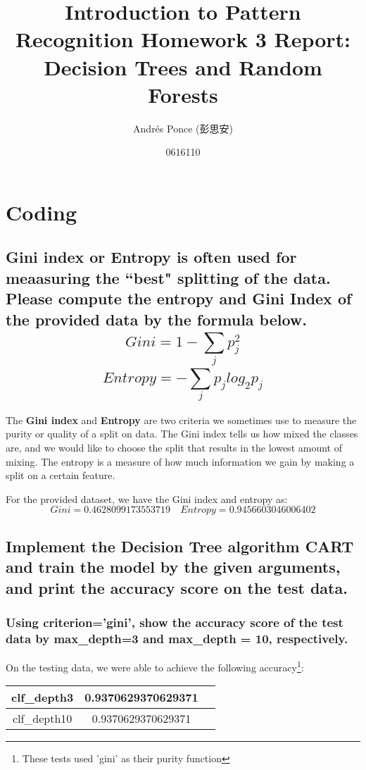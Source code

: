 \documentclass{article}
\title{Introduction to Pattern Recognition Homework 3 Report:
Decision Trees and Random Forests}
\author{Andr\'es Ponce (彭思安)\\
\and
0616110}
\begin{document}
\maketitle


\section{Coding}
	\subsection{Gini index or Entropy is often used for meaasuring the ``best" splitting of the 
		data. Please compute the entropy and Gini Index of the provided data by the formula below.
			\[ Gini = 1 - \sum_{j}^{}p^{2}_{j}\]
			\[ Entropy = -\sum_{j}^{}p_{j}log_{2}p_{j}\]
		}
	The \textbf{Gini index} and \textbf{Entropy} are two criteria we sometimes use to measure the 
	purity or quality of a split on data. The Gini index tells us how mixed the classes are, and 
	we would like to choose the split that results in the lowest amount of mixing. The entropy is
	a measure of how much information we gain by making a split on a certain feature.

	For the provided dataset, we have the Gini index and entropy as:
	\[ Gini = 0.4628099173553719 \quad Entropy = 0.9456603046006402\]

	\subsection{Implement the Decision Tree algorithm CART and train the model by the given arguments,
				and print the accuracy score on the test data.}

		\subsubsection{Using criterion='gini', show the accuracy score of the test data by 
				max\_depth=3 and max\_depth = 10, respectively.}
				On the testing data, we were able to achieve the following accuracy\footnote{These tests used 'gini' as their purity function}:

				\begin{center} 
					\begin{tabular}{|c |c |c |}
						\hline
							clf\_depth3 & 0.9370629370629371\\\hline
							clf\_depth10 & 0.9370629370629371\\
						\hline
					\end{tabular}
				\end{center}
\end{document}
